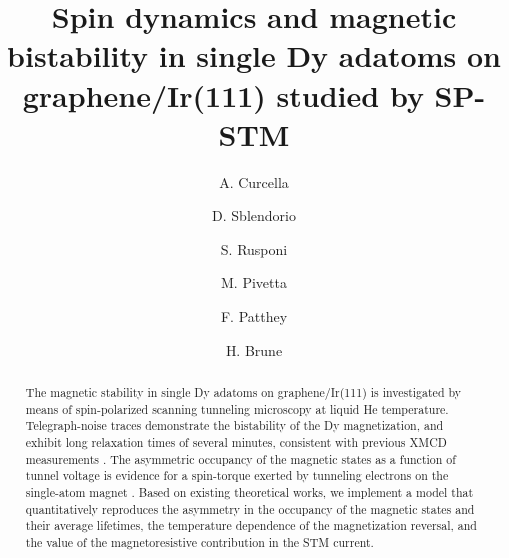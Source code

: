 \documentclass[
reprint,amsmath,amssymb,aps]{revtex4-2}
\begin{document}

\title{Spin dynamics and magnetic bistability in single Dy adatoms on graphene/Ir(111)
studied by SP-STM}

\author{A. Curcella}

\author{D. Sblendorio}

\author{S. Rusponi}

\author{M. Pivetta}

\author{F. Patthey}

\author{H. Brune}
 

\begin{abstract}
The magnetic stability in single Dy adatoms on graphene/Ir(111) is investigated by means of spin-polarized scanning tunneling microscopy at liquid He temperature. Telegraph-noise traces demonstrate the bistability of the Dy magnetization, and exhibit long relaxation times of several minutes, consistent with previous XMCD measurements \citep{baltic2016}.
The asymmetric occupancy of the magnetic states as a function of tunnel voltage is evidence for a spin-torque exerted by tunneling electrons on the single-atom magnet \citep{Khajetoorians2013,delgado2010}.
Based on existing theoretical works, we implement a model that quantitatively reproduces the asymmetry in the occupancy of the magnetic states and their average lifetimes, the temperature dependence of the magnetization reversal, and the value of the magnetoresistive contribution in the STM current. 
\end{abstract}

\maketitle
\end{document}
